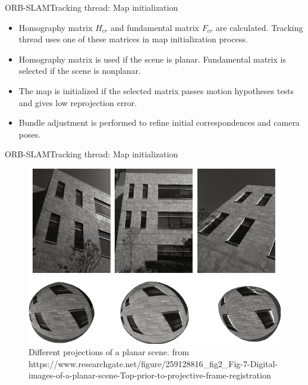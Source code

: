 \documentclass[aspectratio=169]{beamer}
\begin{document}
\begin{frame}{ORB-SLAM}{Tracking thread: Map initialization}

    \begin{itemize}
    \item{
   Homography matrix $H_{cr}$ and fundamental matrix $F_{cr}$ are calculated. Tracking thread uses one of these matrices in map initialization process. 
   }
   \item{
   Homography matrix is used if the scene is planar. Fundamental matrix is selected if the scene is nonplanar. 
   }
   \item{
   The map is initialized if the selected matrix passes motion hypotheses tests and gives low reprojection error.
   }
   \item{
      Bundle adjustment is performed to refine initial correspondences and camera poses.
   }
    \end{itemize}
\end{frame}

\begin{frame}{ORB-SLAM}{Tracking thread: Map initialization}
  \begin{figure}
\includegraphics[scale=0.35]{figs/planar}
\caption{Different projections of a planar scene. from
  https://www.researchgate.net/figure/259128816\_fig2\_Fig-7-Digital-images-of-a-planar-scene-Top-prior-to-projective-frame-registration}
\end{figure}
\end{frame}
\end{document}
